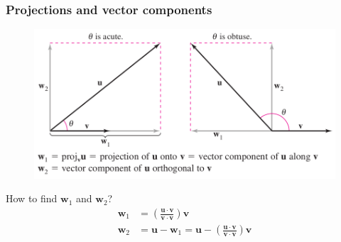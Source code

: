 \documentclass[10pt]{beamer}
\begin{document}
\begin{frame}
\frametitle{Projections and vector components}
\begin{figure}
\centering
\includegraphics[width=1\textwidth]{projection.png}
\end{figure}
\pause
How to find $\mathbf w_1$ and $\mathbf w_2$?
\pause
\begin{align*}
\mathbf w_1 &= \left(\frac{\mathbf u\cdot\mathbf v}{\mathbf v\cdot\mathbf v}\right)\mathbf v\\
\mathbf w_2 &= \mathbf u - \mathbf w_1 = \mathbf u - \left(\frac{\mathbf u\cdot\mathbf v}{\mathbf v\cdot\mathbf v}\right)\mathbf v
\end{align*}
\end{frame}
\end{document}
